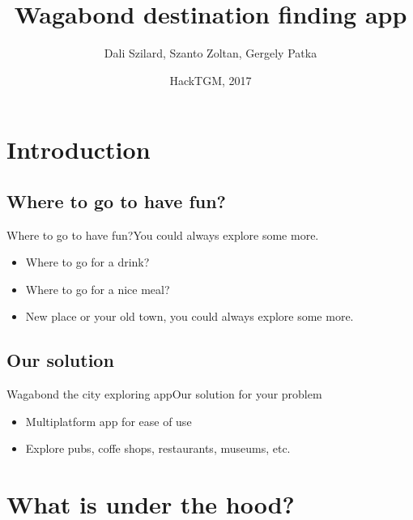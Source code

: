 \documentclass{beamer}
\title{Wagabond destination finding app}
\author{Dali Szilard, Szanto Zoltan, Gergely Patka}
\date{HackTGM, 2017}
\begin{document}
\begin{frame}
  \titlepage
\end{frame}

\begin{frame}{}
  \tableofcontents
\end{frame}


\section{Introduction}

\subsection{Where to go to have fun?}

\begin{frame}{Where to go to have fun?}{You could always explore some more.}

  \begin{itemize}
  \item {Where to go for a drink?    
  }
  \item {Where to go for a nice meal?   
  }
  \item {New place or your old town, you could always explore some more.
   
  }
  \end{itemize}
\end{frame}

\subsection{Our solution}

\begin{frame}{Wagabond the city exploring app}{Our solution for your problem}
  \begin{itemize}
  \item {Multiplatform app for ease of use
  }
  \item {Explore pubs, coffe shops, restaurants, museums, etc.
  }
  \end{itemize}
\end{frame}

\section{What is under the hood?}
\end{document}
